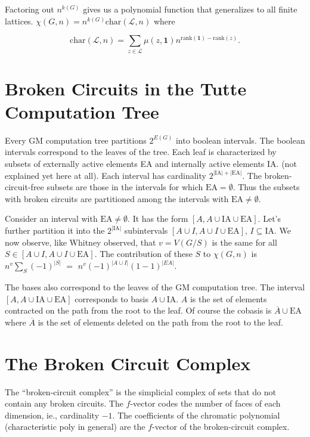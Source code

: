\documentclass{article}
\begin{document}
\begin{enumerate}
Factoring out $n^{k(G)}$ gives us a polynomial function that generalizes 
to all finite lattices.
$\chi(G,n)=n^{k(G)}\text{char}(\mathcal{L},n)$ where

\[
\text{char}(\mathcal{L},n) = 
\sum_{z\in\mathcal{L}}\mu(z,\mathbf{1})n^{\text{rank}(\mathbf{1}) - \text{rank}(z)}.
\]

\section{Broken Circuits in the Tutte Computation Tree}

Every GM computation tree partitions $2^{E(G)}$ into 
boolean intervals\cite{GordonMcMachonGreedoid}.  The boolean
intervals correspond to the leaves of the tree.  Each leaf is
characterized by subsets of externally active elements
EA and internally active elements IA.
(not explained yet here at all).
Each interval has cardinality $2^{|\text{IA}|+|\text{EA}|}$.
The broken-circuit-free subsets are those in the intervals for which
$\text{EA}=\emptyset$.  Thus the subsets with broken circuits are partitioned
among the intervals with $\text{EA}\neq\emptyset$.  

Consider an interval with $\text{EA}\neq\emptyset$. It has the
form $[A, A\cup\text{IA}\cup\text{EA}]$.  Let's further partition
it into the $2^{|\text{IA}|}$ subintervals $[A\cup I, A\cup I\cup \text{EA}]$, 
$I\subseteq\text{IA}$.    
We now observe, like Whitney observed, that
$v=V(G/S)$ is the same for all $S\in[A\cup I, A\cup I\cup \text{EA}]$.  The
contribution of these $S$ to $\chi(G,n)$ is $n^v\sum_S(-1)^{|S|}$ $=$
$n^v(-1)^{|A\cup I|}(1-1)^{|EA|}$.

The bases also correspond to the leaves of the GM computation tree.
The interval $[A,A\cup \text{IA}\cup\text{EA}]$ corresponds to basis
$A\cup\text{IA}$.  $A$ is the set of elements contracted on the path from the 
root to the leaf.  Of course the cobasis is $\overline{A}\cup\text{EA}$ where
$\overline{A}$ is the set of elements deleted on the path from the root to the 
leaf.



\section{The Broken Circuit Complex}

\cite{BrokenCctComplexBryl}

The ``broken-circuit complex'' is the simplicial complex of sets that do not contain
any broken circuits.  The $f$-vector codes the number of faces of each dimension, ie., 
cardinality $-1$.
The coefficients of the chromatic polynomial (characteristic poly in general)
are the $f$-vector of the broken-circuit complex.


\end{enumerate}
\end{document}

